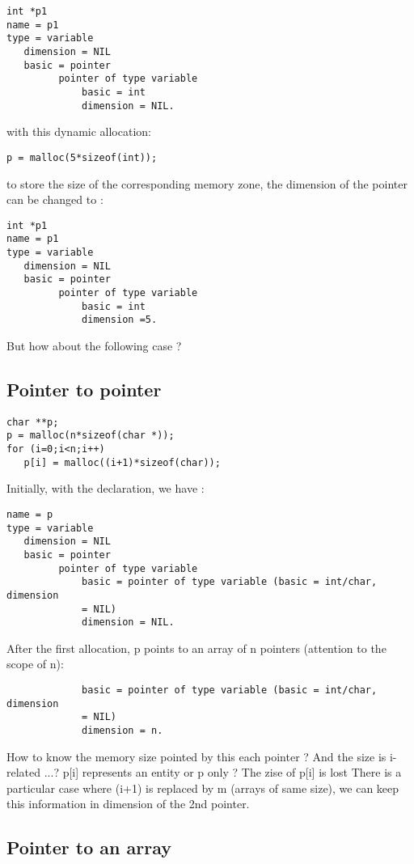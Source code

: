 \documentclass[a4paper]{report}
\begin{document}
\begin{verbatim}
int *p1
name = p1
type = variable
   dimension = NIL
   basic = pointer
         pointer of type variable
             basic = int
             dimension = NIL.
\end{verbatim}
with this dynamic allocation:
\begin{lstlisting}
p = malloc(5*sizeof(int));
\end{lstlisting}
to store the size of the corresponding memory zone, the dimension of the
pointer can be changed to : 
\begin{verbatim}
int *p1
name = p1
type = variable
   dimension = NIL
   basic = pointer
         pointer of type variable
             basic = int
             dimension =5.
\end{verbatim}
But how about the following case ?

\subsection{Pointer to pointer}

\begin{lstlisting}
char **p;
p = malloc(n*sizeof(char *));
for (i=0;i<n;i++)
   p[i] = malloc((i+1)*sizeof(char));
\end{lstlisting}
Initially, with the declaration, we have :
\begin{verbatim}
name = p
type = variable
   dimension = NIL
   basic = pointer
         pointer of type variable
             basic = pointer of type variable (basic = int/char, dimension
             = NIL)
             dimension = NIL.
\end{verbatim}
After the first allocation, p points to an array of n pointers (attention
to the scope of n):
\begin{verbatim}
             basic = pointer of type variable (basic = int/char, dimension
             = NIL)
             dimension = n.
\end{verbatim}
How to know the memory size pointed by this each pointer ? And the size is
i-related ...? p[i] represents an entity or p only ? The zise of p[i] is
lost  There is a particular case where (i+1) is replaced by m (arrays of
same size), we can keep this information in dimension of the 2nd pointer. 

\subsection{Pointer to an array}
\end{document}
